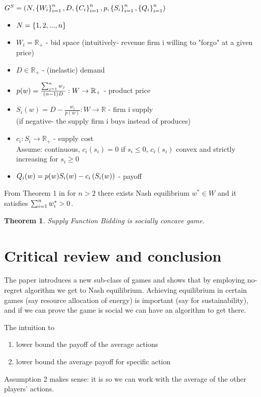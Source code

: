 \documentclass[11pt]{article}
\newtheorem{theorem}{Theorem}[section]
\theoremstyle{definition}
\theoremstyle{definition}
\begin{document}
$G^S = \left( N, \left\{ W_i \right\}_{i=1}^{n}, D, \left\{ C_i \right\}_{i=1}^{n}, p, \left\{ S_i \right\}_{i=1}^{n}, \left\{ Q_i \right\}_{i=1}^{n} \right)$
\begin{itemize}
	\item
		$N = \left\{ 1,2,...,n \right\}$
	\item
		$W_i = \mathbb{R}_+$ - bid space (intuitively- revenue firm i willing to "forgo" at a given price)
	\item
		$D \in \mathbb{R}_+$ - (inelastic) demand
	\item
		$p(w) = \frac{\sum_{j=1}^n w_j}{(n-1)D} : W \rightarrow \mathbb{R}_+$ - product price
	\item
		$S_i(w) = D - \frac{w_i}{p(w)} : W \rightarrow \mathbb{R}$ - firm i supply\\
		(if negative- the supply firm i buys instead of produces)
	\item
		$c_i : S_i \rightarrow \mathbb{R}_+$ - supply cost\\
		Assume: continuous, $c_i(s_i) = 0$ if $s_i \leq 0$, $c_i(s_i)$ convex and strictly increasing for $s_i \geq 0$
	\item
		$Q_i (w) = p(w) S_i(w) - c_i \left( S_i(w) \right)$ - payoff

\end{itemize}
From Theorem 1 in \cite{supp} for $n > 2$ there exists Nash equilibrium $w^* \in W$ and it satisfies $\sum_{i=1}^n w^*_i > 0$.

\begin{theorem}\label{supp}
	Supply Function Bidding is socially concave game.
\end{theorem}


\section{Critical review and conclusion}
The paper introduces a new sub-class of games and shows that by employing no-regret algorithm we get to Nash equilibrium. Achieving equilibrium in certain games (say resource allocation of energy) is important (say for sustainability), and if we can prove the game is social we can have an algorithm to get there.

The intuition to 
\begin{enumerate}
	\item
		lower bound the payoff of the average actions
	\item
		lower bound the average payoff for specific action
\end{enumerate}

Assumption 2 makes sense: it is so we can work with the average of the other players' actions.
\end{document}
